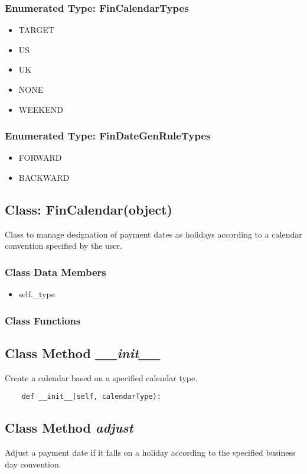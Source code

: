 \documentclass[twoside,11pt]{book}
\begin{document}
\subsubsection{Enumerated Type: FinCalendarTypes}
\begin{itemize}
\item{TARGET}
\item{US}
\item{UK}
\item{NONE}
\item{WEEKEND}
\end{itemize}

\subsubsection{Enumerated Type: FinDateGenRuleTypes}
\begin{itemize}
\item{FORWARD}
\item{BACKWARD}
\end{itemize}

\subsection{Class: FinCalendar(object)}
Class to manage designation of payment dates as holidays according to a calendar convention specified by the user. 

\subsubsection{Class Data Members}
\begin{itemize}
\item{self.\_type}
\end{itemize}

\subsubsection{Class Functions}

\subsection{Class Method {\it \_\_init\_\_}}
Create a calendar based on a specified calendar type. 

\begin{lstlisting}
    def __init__(self, calendarType):
\end{lstlisting}

\subsection{Class Method {\it adjust}}
Adjust a payment date if it falls on a holiday according to the specified business day convention. 
\end{document}
